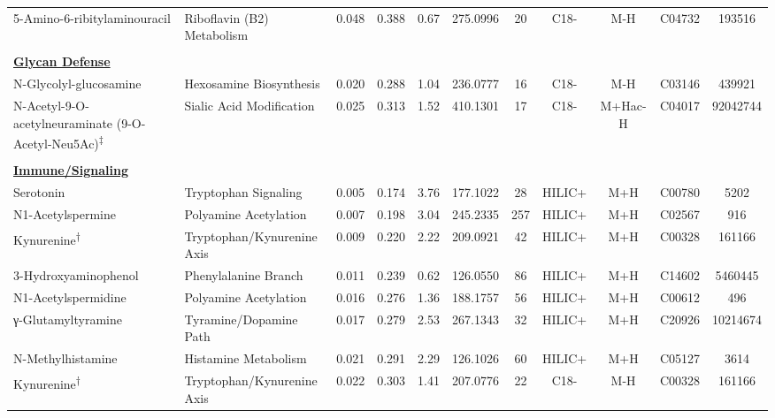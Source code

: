 \begin{longtable}[t]{llccccccccc}
\hspace*{0.3cm}5-Amino-6-ribitylaminouracil & Riboflavin (B2) Metabolism & 0.048 & 0.388 & 0.67 & 275.0996 & 20 & C18- & M-H & C04732 & 193516\\
 &  &  &  &  &  &  &  &  &  & \\
\fontsize{9pt}{10.8pt}\selectfont\textbf{\underline{Glycan Defense}} &  &  &  &  &  &  &  &  &  & \\
\hspace*{0.3cm}N-Glycolyl-glucosamine & Hexosamine Biosynthesis & 0.020 & 0.288 & 1.04 & 236.0777 & 16 & C18- & M-H & C03146 & 439921\\
\hspace*{0.3cm}N-Acetyl-9-O-acetylneuraminate (9-O-Acetyl-Neu5Ac)\textsuperscript{‡} & Sialic Acid Modification & 0.025 & 0.313 & 1.52 & 410.1301 & 17 & C18- & M+Hac-H & C04017 & 92042744\\

 &  &  &  &  &  &  &  &  &  & \\
\fontsize{9pt}{10.8pt}\selectfont\textbf{\underline{Immune/Signaling}} &  &  &  &  &  &  &  &  &  & \\
\hspace*{0.3cm}Serotonin & Tryptophan Signaling & 0.005 & 0.174 & 3.76 & 177.1022 & 28 & HILIC+ & M+H & C00780 & 5202\\
\hspace*{0.3cm}N1-Acetylspermine & Polyamine Acetylation & 0.007 & 0.198 & 3.04 & 245.2335 & 257 & HILIC+ & M+H & C02567 & 916\\
\hspace*{0.3cm}Kynurenine\textsuperscript{†} & Tryptophan/Kynurenine Axis & 0.009 & 0.220 & 2.22 & 209.0921 & 42 & HILIC+ & M+H & C00328 & 161166\\

\hspace*{0.3cm}3-Hydroxyaminophenol & Phenylalanine Branch & 0.011 & 0.239 & 0.62 & 126.0550 & 86 & HILIC+ & M+H & C14602 & 5460445\\
\hspace*{0.3cm}N1-Acetylspermidine & Polyamine Acetylation & 0.016 & 0.276 & 1.36 & 188.1757 & 56 & HILIC+ & M+H & C00612 & 496\\
\hspace*{0.3cm}γ-Glutamyltyramine & Tyramine/Dopamine Path & 0.017 & 0.279 & 2.53 & 267.1343 & 32 & HILIC+ & M+H & C20926 & 10214674\\
\hspace*{0.3cm}N-Methylhistamine & Histamine Metabolism & 0.021 & 0.291 & 2.29 & 126.1026 & 60 & HILIC+ & M+H & C05127 & 3614\\
\hspace*{0.3cm}Kynurenine\textsuperscript{†} & Tryptophan/Kynurenine Axis & 0.022 & 0.303 & 1.41 & 207.0776 & 22 & C18- & M-H & C00328 & 161166\\


\end{longtable}
